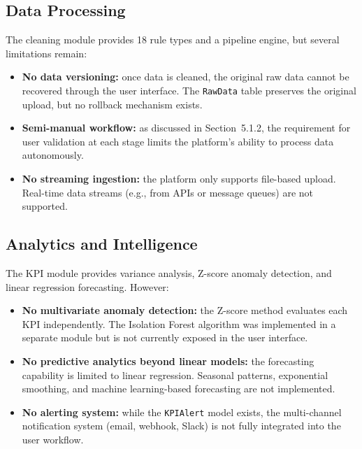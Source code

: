 \subsection{Data Processing}

\noindent
The cleaning module provides 18 rule types
and a pipeline engine,
but several limitations remain:

\begin{itemize}
  \item \textbf{No data versioning:}
        once data is cleaned,
        the original raw data
        cannot be recovered
        through the user interface.
        The \texttt{RawData} table
        preserves the original upload,
        but no rollback mechanism exists.
  \item \textbf{Semi-manual workflow:}
        as discussed in Section~5.1.2,
        the requirement for user validation
        at each stage
        limits the platform's ability
        to process data autonomously.
  \item \textbf{No streaming ingestion:}
        the platform only supports
        file-based upload.
        Real-time data streams
        (e.g., from APIs or message queues)
        are not supported.
\end{itemize}

\subsection{Analytics and Intelligence}

\noindent
The KPI module provides variance analysis,
Z-score anomaly detection,
and linear regression forecasting.
However:

\begin{itemize}
  \item \textbf{No multivariate anomaly detection:}
        the Z-score method evaluates
        each KPI independently.
        The Isolation Forest algorithm
        was implemented in a separate module
        but is not currently exposed
        in the user interface.
  \item \textbf{No predictive analytics beyond linear models:}
        the forecasting capability
        is limited to linear regression.
        Seasonal patterns, exponential smoothing,
        and machine learning-based forecasting
        are not implemented.
  \item \textbf{No alerting system:}
        while the \texttt{KPIAlert} model exists,
        the multi-channel notification system
        (email, webhook, Slack)
        is not fully integrated
        into the user workflow.
\end{itemize}

